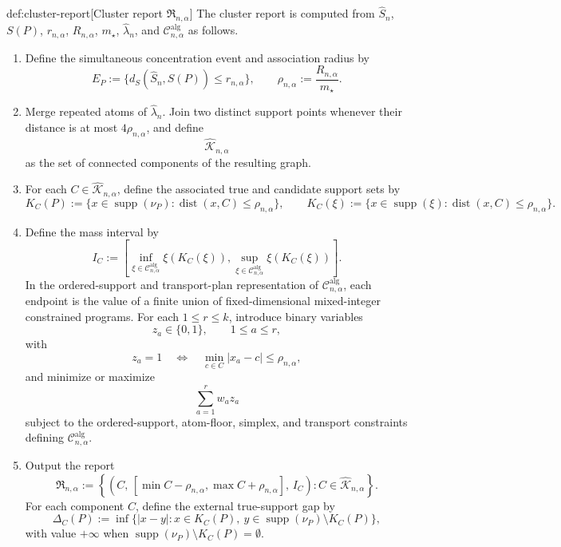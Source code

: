 \begin{algorithmv}{def:cluster-report}[Cluster report \(\mathfrak R_{n,\alpha}\)]
The cluster report is computed from \(\widehat S_n\), \(S(P)\), \(r_{n,\alpha}\), \(R_{n,\alpha}\), \(m_\star\), \(\widehat\lambda_n\), and \(\mathcal C^{\mathrm{alg}}_{n,\alpha}\) as follows.
\begin{enumerate}
\item Define the simultaneous concentration event and association radius by
\[
E_P:=\{d_S(\widehat S_n,S(P))\le r_{n,\alpha}\},
\qquad
\rho_{n,\alpha}:=\frac{R_{n,\alpha}}{m_\star}.
\]
\item Merge repeated atoms of \(\widehat\lambda_n\). Join two distinct support points whenever their distance is at most \(4\rho_{n,\alpha}\), and define
\[
\widehat{\mathscr K}_{n,\alpha}
\]
as the set of connected components of the resulting graph.
\item For each \(C\in\widehat{\mathscr K}_{n,\alpha}\), define the associated true and candidate support sets by
\[
K_C(P):=\{x\in\operatorname{supp}(\nu_P):\operatorname{dist}(x,C)\le\rho_{n,\alpha}\},
\qquad
K_C(\xi):=\{x\in\operatorname{supp}(\xi):\operatorname{dist}(x,C)\le\rho_{n,\alpha}\}.
\]
\item Define the mass interval by
\[
I_C:=\left[
\inf_{\xi\in\mathcal C^{\mathrm{alg}}_{n,\alpha}}\xi(K_C(\xi)),
\sup_{\xi\in\mathcal C^{\mathrm{alg}}_{n,\alpha}}\xi(K_C(\xi))
\right].
\]
In the ordered-support and transport-plan representation of \(\mathcal C^{\mathrm{alg}}_{n,\alpha}\), each endpoint is the value of a finite union of fixed-dimensional mixed-integer constrained programs. For each \(1\le r\le k\), introduce binary variables
\[
z_a\in\{0,1\},\qquad 1\le a\le r,
\]
with
\[
z_a=1\quad\Longleftrightarrow\quad \min_{c\in C}|x_a-c|\le\rho_{n,\alpha},
\]
and minimize or maximize
\[
\sum_{a=1}^r w_a z_a
\]
subject to the ordered-support, atom-floor, simplex, and transport constraints defining \(\mathcal C^{\mathrm{alg}}_{n,\alpha}\).
\item Output the report
\[
\mathfrak R_{n,\alpha}
:=
\left\{
\left(
C,\,
[\min C-\rho_{n,\alpha},\max C+\rho_{n,\alpha}],\,
I_C
\right):
C\in\widehat{\mathscr K}_{n,\alpha}
\right\}.
\]
For each component \(C\), define the external true-support gap by
\[
\Delta_C(P):=\inf\{|x-y|:x\in K_C(P),\ y\in\operatorname{supp}(\nu_P)\setminus K_C(P)\},
\]
with value \(+\infty\) when \(\operatorname{supp}(\nu_P)\setminus K_C(P)=\emptyset\).
\end{enumerate}
\end{algorithmv}

